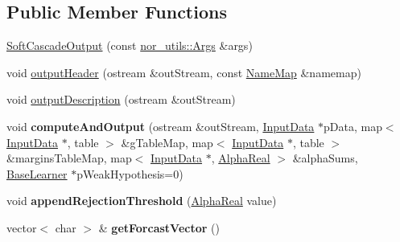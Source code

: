 \subsection*{Public Member Functions}
\begin{DoxyCompactItemize}
\item 
\hyperlink{classMultiBoost_1_1SoftCascadeOutput_a7b6e7fc344cad80df8bb646e1ef72c5e}{Soft\-Cascade\-Output} (const \hyperlink{classnor__utils_1_1Args}{nor\-\_\-utils\-::\-Args} \&args)
\item 
void \hyperlink{classMultiBoost_1_1SoftCascadeOutput_a6af5a3af1f5ecee45ded3db7ce982b41}{output\-Header} (ostream \&out\-Stream, const \hyperlink{classMultiBoost_1_1NameMap}{Name\-Map} \&namemap)
\item 
void \hyperlink{classMultiBoost_1_1SoftCascadeOutput_ab1774f3f89e45bdde27936f890640065}{output\-Description} (ostream \&out\-Stream)
\item 
\hypertarget{classMultiBoost_1_1SoftCascadeOutput_af04ec06500624d4d79a3cd25910b1c8e}{void {\bfseries compute\-And\-Output} (ostream \&out\-Stream, \hyperlink{classMultiBoost_1_1InputData}{Input\-Data} $\ast$p\-Data, map$<$ \hyperlink{classMultiBoost_1_1InputData}{Input\-Data} $\ast$, table $>$ \&g\-Table\-Map, map$<$ \hyperlink{classMultiBoost_1_1InputData}{Input\-Data} $\ast$, table $>$ \&margins\-Table\-Map, map$<$ \hyperlink{classMultiBoost_1_1InputData}{Input\-Data} $\ast$, \hyperlink{Defaults_8h_a80184c4fd10ab70a1a17c5f97dcd1563}{Alpha\-Real} $>$ \&alpha\-Sums, \hyperlink{classMultiBoost_1_1BaseLearner}{Base\-Learner} $\ast$p\-Weak\-Hypothesis=0)}\label{classMultiBoost_1_1SoftCascadeOutput_af04ec06500624d4d79a3cd25910b1c8e}

\item 
\hypertarget{classMultiBoost_1_1SoftCascadeOutput_a0090b28ef8eb2863ea590ea80407896e}{void {\bfseries append\-Rejection\-Threshold} (\hyperlink{Defaults_8h_a80184c4fd10ab70a1a17c5f97dcd1563}{Alpha\-Real} value)}\label{classMultiBoost_1_1SoftCascadeOutput_a0090b28ef8eb2863ea590ea80407896e}

\item 
\hypertarget{classMultiBoost_1_1SoftCascadeOutput_af3450dd6de288d36350f558ca2d67521}{vector$<$ char $>$ \& {\bfseries get\-Forcast\-Vector} ()}\label{classMultiBoost_1_1SoftCascadeOutput_af3450dd6de288d36350f558ca2d67521}

\end{DoxyCompactItemize}
